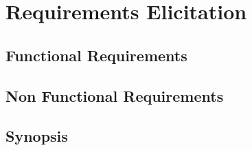 \chapter{Requirements Elicitation}
\label{chap:requirements}

\section{Functional Requirements}
\label{sec:requirements:functional}

\section{Non Functional Requirements}
\label{sec:requirements:non_functional}

\section{Synopsis}
\label{sec:requirements:synopsis}
